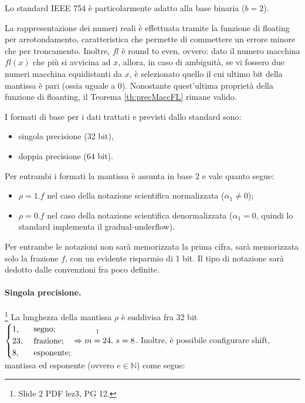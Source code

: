 Lo standard IEEE 754 è particolarmente adatto alla base binaria ($b=2$).

La rappresentazione dei numeri reali è effettuata tramite la funzione di floating per arrotondamento, caratteristica che permette di commettere un errore minore che per troncamento. Inoltre, $fl$ è round to even, ovvero: dato il numero macchina $fl(x)$ che più si avvicina ad $x$, allora, in caso di ambiguità, se vi fossero due numeri macchina equidistanti da $x$, è selezionato quello il cui ultimo bit della mantissa è pari (ossia uguale a 0). Nonostante quest'ultima proprietà della funzione di floanting, il Teorema \ref{th:precMaccFL} rimane valido. 

I formati di base per i dati trattati e previsti dallo standard sono:
\begin{itemize}
    \item singola precisione (32 bit),
    \item doppia precisione (64 bit).
\end{itemize}

Per entrambi i formati la mantissa è assunta in base 2 e vale quanto segue:
\begin{itemize}
    \item $\rho=1.f$ nel caso della notazione scientifica normalizzata ($\alpha_1\neq 0$);
    \item $\rho=0.f$ nel caso della notazione scientifica denormalizzata ($\alpha_1=0$, quindi lo standard implementa il gradual-underflow).
\end{itemize}

Per entrambe le notazioni non sarà memorizzata la prima cifra, sarà memorizzata solo la frazione $f$, con un evidente risparmio di 1 bit. Il tipo di notazione sarà dedotto dalle convenzioni fra poco definite.

\paragraph{Singola precisione.}\footnote{Slide 2 PDF lez3, PG 12.}
La lunghezza della mantissa $\rho$ è suddivisa fra 32 bit $\begin{cases}
    1, &\text{ segno};\\
    23, &\text{ frazione};\\
    8, &\text{ esponente};
\end{cases}\Rightarrow \overset{\footnotemark}{m=24},\, s=8$. Inoltre, è possibile configurare shift, mantissa ed esponente (ovvero $e\in\mathbb N$) come segue:

